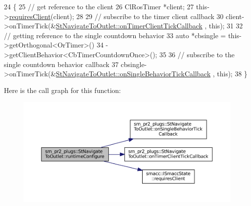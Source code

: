 \begin{DoxyCode}
24     \{
25         \textcolor{comment}{// get reference to the client}
26         ClRosTimer *client;
27         this->\hyperlink{classsmacc_1_1ISmaccState_a7f95c9f0a6ea2d6f18d1aec0519de4ac}{requiresClient}(client);
28 
29         \textcolor{comment}{// subscribe to the timer client callback}
30         client->onTimerTick(&\hyperlink{structsm__pr2__plugs_1_1StNavigateToOutlet_ab990f0f422deb0ef6dd4fcce9cb2823b}{StNavigateToOutlet::onTimerClientTickCallback}
      , \textcolor{keyword}{this});
31 
32         \textcolor{comment}{// getting reference to the single countdown behavior}
33         \textcolor{keyword}{auto} *cbsingle = this->getOrthogonal<OrTimer>()
34                              ->getClientBehavior<CbTimerCountdownOnce>();
35 
36         \textcolor{comment}{// subscribe to the single countdown behavior callback}
37         cbsingle->onTimerTick(&\hyperlink{structsm__pr2__plugs_1_1StNavigateToOutlet_ae6a6ee95bcc854792f0b16286a113a06}{StNavigateToOutlet::onSingleBehaviorTickCallback}
      , \textcolor{keyword}{this});
38     \}
\end{DoxyCode}
Here is the call graph for this function\+:
\nopagebreak
\begin{figure}[H]
\begin{center}
\leavevmode
\includegraphics[width=350pt]{structsm__pr2__plugs_1_1StNavigateToOutlet_aa36e4f478b3dc1c2b8fae6ef51f4d4f8_cgraph}
\end{center}
\end{figure}
\mbox{\label{structsm__pr2__plugs_1_1StNavigateToOutlet_a2dbe242376149d872ee92006b378ebf9}} 
